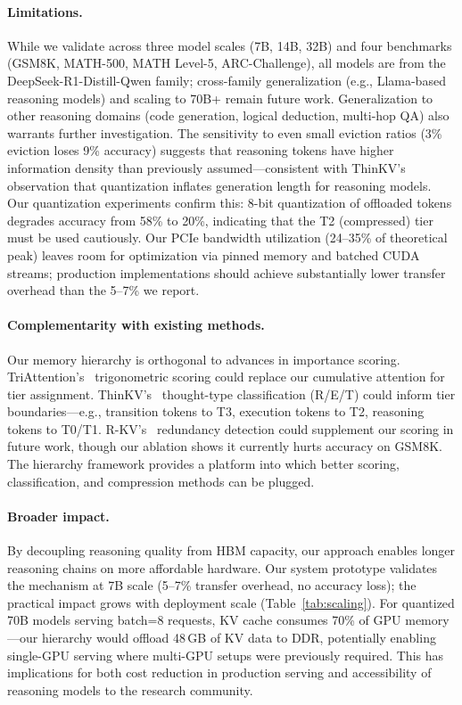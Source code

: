 \documentclass{article}
\begin{document}
\paragraph{Limitations.}
While we validate across three model scales (7B, 14B, 32B) and four benchmarks (GSM8K, MATH-500, MATH Level-5, ARC-Challenge), all models are from the DeepSeek-R1-Distill-Qwen family; cross-family generalization (e.g., Llama-based reasoning models) and scaling to 70B+ remain future work.
Generalization to other reasoning domains (code generation, logical deduction, multi-hop QA) also warrants further investigation.
The sensitivity to even small eviction ratios (3\% eviction loses 9\% accuracy) suggests that reasoning tokens have higher information density than previously assumed---consistent with ThinKV's observation that quantization inflates generation length for reasoning models.
Our quantization experiments confirm this: 8-bit quantization of offloaded tokens degrades accuracy from 58\% to 20\%, indicating that the T2 (compressed) tier must be used cautiously.
Our PCIe bandwidth utilization (24--35\% of theoretical peak) leaves room for optimization via pinned memory and batched CUDA streams; production implementations should achieve substantially lower transfer overhead than the 5--7\% we report.

\paragraph{Complementarity with existing methods.}
Our memory hierarchy is orthogonal to advances in importance scoring.
TriAttention's~\cite{triattention} trigonometric scoring could replace our cumulative attention for tier assignment.
ThinKV's~\cite{thinkv} thought-type classification (R/E/T) could inform tier boundaries---e.g., transition tokens to T3, execution tokens to T2, reasoning tokens to T0/T1.
R-KV's~\cite{rkv} redundancy detection could supplement our scoring in future work, though our ablation shows it currently hurts accuracy on GSM8K.
The hierarchy framework provides a platform into which better scoring, classification, and compression methods can be plugged.

\paragraph{Broader impact.}
By decoupling reasoning quality from HBM capacity, our approach enables longer reasoning chains on more affordable hardware.
Our system prototype validates the mechanism at 7B scale (5--7\% transfer overhead, no accuracy loss); the practical impact grows with deployment scale (Table~\ref{tab:scaling}).
For quantized 70B models serving batch=8 requests, KV cache consumes 70\% of GPU memory---our hierarchy would offload 48\,GB of KV data to DDR, potentially enabling single-GPU serving where multi-GPU setups were previously required.
This has implications for both cost reduction in production serving and accessibility of reasoning models to the research community.
\end{document}

